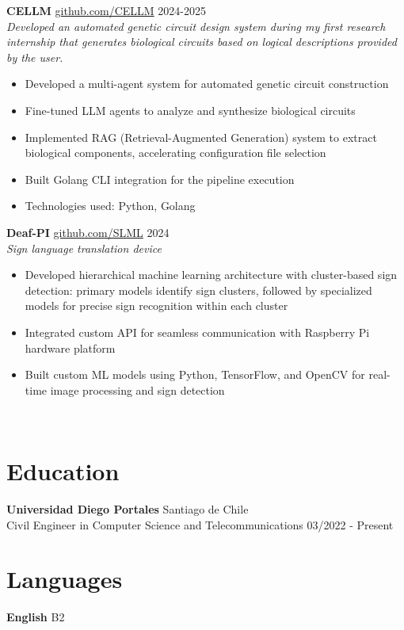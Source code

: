 \documentclass[a4paper,11pt]{article}
\begin{document}
\textbf{CELLM} \href{https://github.com/lexO-dat/CELLM}{github.com/CELLM} \hfill 2024-2025 \\
\textit{Developed an automated genetic circuit design system during my first research internship that generates biological circuits based on logical descriptions provided by the user.}
\begin{itemize}
\item Developed a multi-agent system for automated genetic circuit construction
\item Fine-tuned LLM agents to analyze and synthesize biological circuits
\item Implemented RAG (Retrieval-Augmented Generation) system to extract biological components, accelerating configuration file selection
\item Built Golang CLI integration for the pipeline execution
\item Technologies used: Python, Golang
\end{itemize}

\textbf{Deaf-PI} \href{https://github.com/lexO-dat/SLML}{github.com/SLML} \hfill 2024 \\
\textit{Sign language translation device}
\begin{itemize}
    \item Developed hierarchical machine learning architecture with cluster-based sign detection: primary models identify sign clusters, followed by specialized models for precise sign recognition within each cluster
    \item Integrated custom API for seamless communication with Raspberry Pi hardware platform
    \item Built custom ML models using Python, TensorFlow, and OpenCV for real-time image processing and sign detection
\end{itemize}
\\
\hline
\section*{Education}
\textbf{Universidad Diego Portales} \hfill Santiago de Chile \\
Civil Engineer in Computer Science and Telecommunications \hfill 03/2022 - Present
\\
\hline
\section*{Languages}
\textbf{English} \hfill B2
\end{document}
